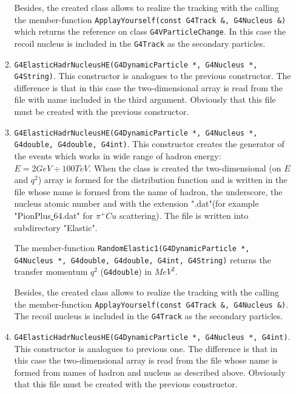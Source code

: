 \documentclass[12pt]{article}
\begin{document}
\begin{enumerate}
\begin{enumerate}
Besides, the created class allows to realize the tracking 
with the calling the member-function 
{\tt ApplayYourself(const G4Track \&, G4Nucleus \&)} which returns
the reference on class {\tt G4VParticle\-Chan\-ge}.
In this case the recoil nucleus  is included in 
the {\tt G4Track} as the secondary particles.

\item  {\tt G4ElasticHadrNucleusHE(G4DynamicParticle *, 
G4Nucleus *, 
G4String)}. This constructor is analogues to the previous constructor. 
The difference is that in this case the two-dimensional 
array is read from the file with name included in 
the third argument. Obviously that this file must be created with 
the previous constructor.

\item {\tt G4ElasticHadrNucleusHE(G4DynamicParticle *, 
G4Nucleus *,
G4double, G4double, G4int)}. This constructor creates 
the generator of the events which works in wide range of hadron 
energy: $E=2 GeV \div 100 TeV$.  
When the class is created the two-dimensional (on $E$ and $q^2$)
array is formed for the distribution function and is 
written in the file whose name is formed from the name of hadron,
the underscore, the nucleus atomic number 
and with the extension ".dat"(for example 
"PionPlus\underline{ }64.dat" for $\pi^+Cu$ scattering). The file is
written into subdirectory "Elastic".

The member-function {\tt RandomElastic1(G4DynamicParticle *,
G4Nucleus *, G4double, G4double, G4int, G4String)} returns
the transfer momentum $q^2$ ({\tt G4double}) in $MeV^2$. 

Besides, the  created class allows to realize the tracking 
with the calling the member-function 
{\tt ApplayYourself(const G4Track \&, G4Nucleus \&)}.  
The recoil nucleus  is included in 
the {\tt G4Track} as the secondary particles.

\item  {\tt G4ElasticHadrNucleusHE(G4DynamicParticle *, 
G4Nucleus *, 
G4int)}. This constructor is analogues to  previous one. 
The difference is that in this case the two-dimensional 
array is read from the file whose name is formed from names of
hadron and nucleus as described above. Obviously that this file 
must be created with the previous constructor.

\end{enumerate}

\end{enumerate}
\end{document}
